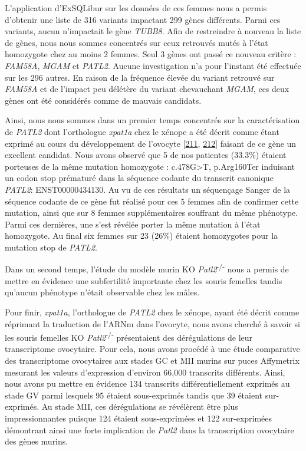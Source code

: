 \documentclass[12pt,a4paper,twoside]{ugathesis}
\theoremstyle{definition}
\theoremstyle{definition}
\theoremstyle{definition}
\theoremstyle{remark}
\begin{document}
L'application d'ExSQLibur sur les données de ces femmes nous a permis
d'obtenir une liste de 316 variants impactant 299 gènes différents.
Parmi ces variants, aucun n'impactait le gène \emph{TUBB8}. Afin de
restreindre à nouveau la liste de gènes, nous nous sommes concentrés sur
ceux retrouvés mutés à l'état homozygote chez au moins 2 femmes. Seul 3
gènes ont passé ce nouveau critère : \emph{FAM58A}, \emph{MGAM} et
\emph{PATL2}. Aucune investigation n'a pour l'instant été effectuée sur
les 296 autres. En raison de la fréquence élevée du variant retrouvé sur
\emph{FAM58A} et de l'impact peu délétère du variant chevauchant
\emph{MGAM}, ces deux gènes ont été considérés comme de mauvais
candidats.

Ainsi, nous nous sommes dans un premier temps concentrés sur la
caractérisation de \emph{PATL2} dont l'orthologue \emph{xpat1a} chez le
xénope a été décrit comme étant exprimé au cours du développement de
l'ovocyte {[}\protect\hyperlink{ref-Marnef2010}{211},
\protect\hyperlink{ref-Nakamura2010}{212}{]} faisant de ce gène un
excellent candidat. Nous avons observé que 5 de nos patientes (33.3\%)
étaient porteuses de la même mutation homozygote :
c.478G\textgreater{}T, p.Arg160Ter induisant un codon stop prématuré
dans la séquence codante du transcrit canonique \emph{PATL2}:
ENST00000434130. Au vu de ces résultats un séquençage Sanger de la
séquence codante de ce gène fut réalisé pour ces 5 femmes afin de
confirmer cette mutation, ainsi que sur 8 femmes supplémentaires
souffrant du même phénotype. Parmi ces dernières, une s'est révélée
porter la même mutation à l'état homozygote. Au final six femmes sur 23
(26\%) étaient homozygotes pour la mutation stop de \emph{PATL2}.

Dans un second temps, l'étude du modèle murin KO
\emph{Patl2}\textsuperscript{-/-} nous a permis de mettre en évidence
une subfertilité importante chez les souris femelles tandis qu'aucun
phénotype n'était observable chez les mâles.

Pour finir, \emph{xpat1a}, l'orthologue de \emph{PATL2} chez le xénope,
ayant été décrit comme réprimant la traduction de l'ARNm dans l'ovocyte,
nous avons cherché à savoir si les souris femelles KO
\emph{Patl2}\textsuperscript{-/-} présentaient des dérégulations de leur
transcriptome ovocytaire. Pour cela, nous avons procédé à une étude
comparative des transcriptome ovocytaires aux stades GC et MII murins
sur puces Affymetrix mesurant les valeurs d'expression d'environ 66,000
transcrits différents. Ainsi, nous avons pu mettre en évidence 134
transcrits différentiellement exprimés au stade GV parmi lesquels 95
étaient sous-exprimés tandis que 39 étaient sur-exprimés. Au stade MII,
ces dérégulations se révélèrent être plus impressionnantes puisque 124
étaient sous-exprimées et 122 sur-exprimées démontrant ainsi une forte
implication de \emph{Patl2} dans la transcription ovocytaire des gènes
murins.
\end{document}
